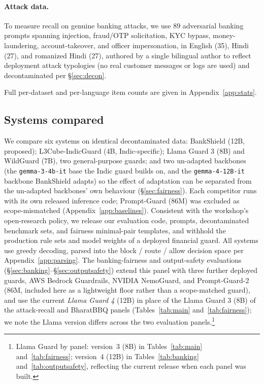 \documentclass[11pt]{article}
\begin{document}
\paragraph{Attack data.} To measure recall on genuine banking attacks, we use 89 adversarial banking prompts spanning injection, fraud/OTP solicitation, KYC bypass, money-laundering, account-takeover, and officer impersonation, in English (35), Hindi (27), and romanized Hindi (27), authored by a single bilingual author to reflect deployment attack typologies (no real customer messages or logs are used) and decontaminated per \S\ref{sec:decon}.

Full per-dataset and per-language item counts are given in Appendix~\ref{app:stats}.

\subsection{Systems compared}
\label{sec:systems}

We compare six systems on identical decontaminated data: BankShield (12B, proposed); L3Cube-IndicGuard \citep{bramhecha2026} (4B, Indic-specific); Llama Guard 3 \citep{grattafiori2024} (8B) and WildGuard \citep{han2024wildguard} (7B), two general-purpose guards; and two un-adapted backbones (the \texttt{gemma-3-4b-it} base the Indic guard builds on, and the \texttt{gemma-4-12B-it} backbone BankShield adapts) so the effect of adaptation can be separated from the un-adapted backbones' own behaviour (\S\ref{sec:fairness}). Each competitor runs with its own released inference code; Prompt-Guard (86M) was excluded as scope-mismatched (Appendix~\ref{app:baselines}). Consistent with the workshop's open-research policy, we release our evaluation code, prompts, decontaminated benchmark sets, and fairness minimal-pair templates, and withhold the production rule sets and model weights of a deployed financial guard. All systems use greedy decoding, parsed into the block / route / allow decision space per Appendix~\ref{app:parsing}. The banking-fairness and output-safety evaluations (\S\ref{sec:banking}--\S\ref{sec:outputsafety}) extend this panel with three further deployed guards, AWS Bedrock Guardrails, NVIDIA NemoGuard, and Prompt-Guard-2 (86M, included here as a lightweight floor rather than a scope-matched guard), and use the current \emph{Llama Guard 4} (12B) in place of the Llama Guard 3 (8B) of the attack-recall and BharatBBQ panels (Tables~\ref{tab:main} and~\ref{tab:fairness}); we note the Llama version differs across the two evaluation panels.\footnote{Llama Guard by panel: version~3 (8B) in Tables~\ref{tab:main} and~\ref{tab:fairness}; version~4 (12B) in Tables~\ref{tab:banking} and~\ref{tab:outputsafety}, reflecting the current release when each panel was built.}
\end{document}
